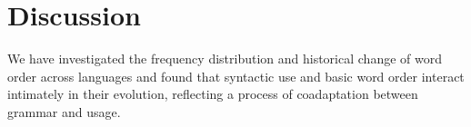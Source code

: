 \documentclass[9pt,twocolumn,twoside,lineno]{pnas-new}
\begin{document}










\section*{Discussion}

We have investigated the frequency distribution and historical change of word order  across languages and found that syntactic use and basic word order interact intimately in their evolution,  reflecting a process of coadaptation  between grammar and usage.





\end{document}
